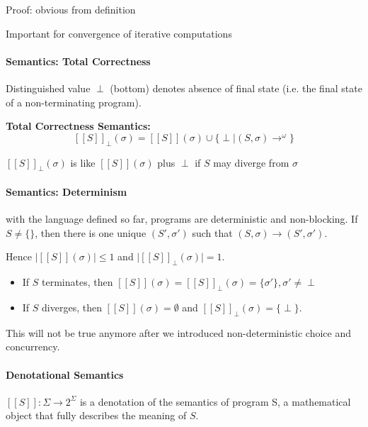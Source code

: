 \documentclass[12pt, a4paper]{book}
\begin{document}
\noindent Proof: obvious from definition \newline

Important for convergence of iterative computations \newline

\paragraph{Semantics: Total Correctness}

Distinguished value $\perp$ (bottom) denotes absence of final state (i.e.
the final state of a non-terminating program).

\textbf{Total Correctness Semantics:}
$$
{[[S]]}_{\perp}(\sigma) = [[S]](\sigma) \cup \{\perp \mid (S,\sigma) \longrightarrow^{\omega}\}
$$

${[[S]]}_{\perp}(\sigma)$ is like $[[S]](\sigma)$ plus $\perp$ if $S$ may
diverge from $\sigma$

\paragraph{Semantics: Determinism}

with the language defined so far, programs are deterministic and non-blocking.
If $S \neq \{ \}$, then there is one unique $(S',\sigma')$ such that
$(S,\sigma) \longrightarrow (S', \sigma')$. \newline

Hence $\lvert [[S]](\sigma) \rvert \le 1$ and $\lvert {[[S]]}_{\perp}(\sigma) \rvert = 1$. \\
\begin{itemize}
    \item If $S$ terminates, then
    $[[S]](\sigma) = {[[S]]}_{\perp}(\sigma) = \{\sigma'\}, \sigma' \neq \perp$
    \item If $S$ diverges, then $[[S]](\sigma) = \emptyset$ and
    ${[[S]]}_{\perp}(\sigma) = \{\perp\}$.
\end{itemize}

This will not be true anymore after we introduced non-deterministic choice and
concurrency.

\paragraph{Denotational Semantics}

$[[S]] : \Sigma \rightarrow 2^{\Sigma}$ is a denotation of the semantics of
program S, a mathematical object that fully describes the meaning of $S$.
\end{document}
